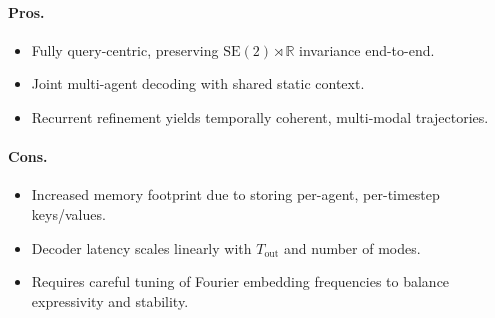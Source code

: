 \paragraph{Pros.}
\begin{itemize}[leftmargin=*, label=\greenoplus]
  \item Fully query-centric, preserving \(\mathrm{SE}(2)\!\rtimes\!\mathbb{R}\) invariance end-to-end.
  \item Joint multi-agent decoding with shared static context.
  \item Recurrent refinement yields temporally coherent, multi-modal trajectories.
\end{itemize}

\paragraph{Cons.}
\begin{itemize}[leftmargin=*, label=\redominus]
  \item Increased memory footprint due to storing per-agent, per-timestep keys/values.
  \item Decoder latency scales linearly with \(T_{\text{out}}\) and number of modes.
  \item Requires careful tuning of Fourier embedding frequencies to balance expressivity and stability.
\end{itemize}